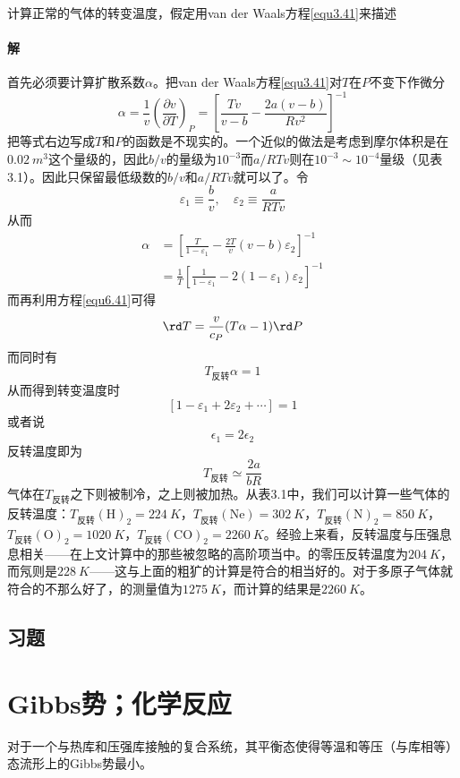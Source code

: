 \begin{example}
计算正常的气体的转变温度，假定用van der Waals方程\eqref{equ3.41}来描述

\paragraph{解} 首先必须要计算扩散系数$\alpha$。把van der Waals方程\eqref{equ3.41}对$T$在$P$不变下作微分
\[\alpha = \frac{1}{v}\left(\frac{\partial v}{\partial T}\right)_P=\left[\frac{Tv}{v-b}-\frac{2a(v-b)}{Rv^2}\right]^{-1} \]
把等式右边写成$T$和$P$的函数是不现实的。一个近似的做法是考虑到摩尔体积是在$\SI{0.02}{m^3}$这个量级的，因此$b/v$的量级为$10^{-3}$而$a/RTv$则在$10^{-3}\sim 10^{-4}$量级（见表3.1）。因此只保留最低级数的$b/v$和$a/RTv$就可以了。令
\[
	\varepsilon_1 \equiv \frac{b}{v}, \quad \varepsilon_2 \equiv\frac{a}{RTv} 
\]
从而
\[\begin{split}
	\alpha &= \left[\frac{T}{1-\varepsilon_1} - \frac{2T}{v}(v-b)\varepsilon_2 \right]^{-1} \\
	&= \frac{1}{T} \left[ \frac{1}{1-\varepsilon_1}-2(1-\varepsilon_1)\varepsilon_2 \right]^{-1}
\end{split} \]
而再利用方程\eqref{equ6.41}可得
\[
	\rd T = \frac{v}{c_P}(T\alpha - 1) \rd P 
\]
而同时有
\[
	T_{\text{反转}} \alpha = 1 
\]
从而得到转变温度时
\[
	[1 - \varepsilon_1 + 2\varepsilon_2 + \cdots] = 1 
\]
或者说
\[
	\epsilon_1 = 2\epsilon_2 
\]
反转温度即为
\[
	T_{\text{反转}} \simeq \frac{2a}{bR} 
\]
气体在$T_{\text{反转}}$之下则被制冷，之上则被加热。从表3.1中，我们可以计算一些气体的反转温度：$T_{\text{反转}}(\mathrm{H})_2 = \SI{224}{K}$，$T_{\text{反转}}(\mathrm{Ne}) = \SI{302}{K}$，$T_{\text{反转}}(\mathrm{N})_2 = \SI{850}{K}$，$T_{\text{反转}}(\mathrm{O})_2 = \SI{1020}{K}$，$T_{\text{反转}}(\mathrm{CO})_2 = \SI{2260}{K}$。经验上来看，反转温度与压强息息相关——在上文计算中的那些被忽略的高阶项当中。的零压反转温度为$\SI{204}{K}$，而氖则是$\SI{228}{K}$——这与上面的粗犷的计算是符合的相当好的。对于多原子气体就符合的不那么好了，的测量值为$\SI{1275}{K}$，而计算的结果是$\SI{2260}{K}$。
\end{example}

\subsection*{习题}

\section{Gibbs势；化学反应}
\label{sec6.4}
对于一个与热库和压强库接触的复合系统，其平衡态使得等温和等压（与库相等）态流形上的Gibbs势最小。

